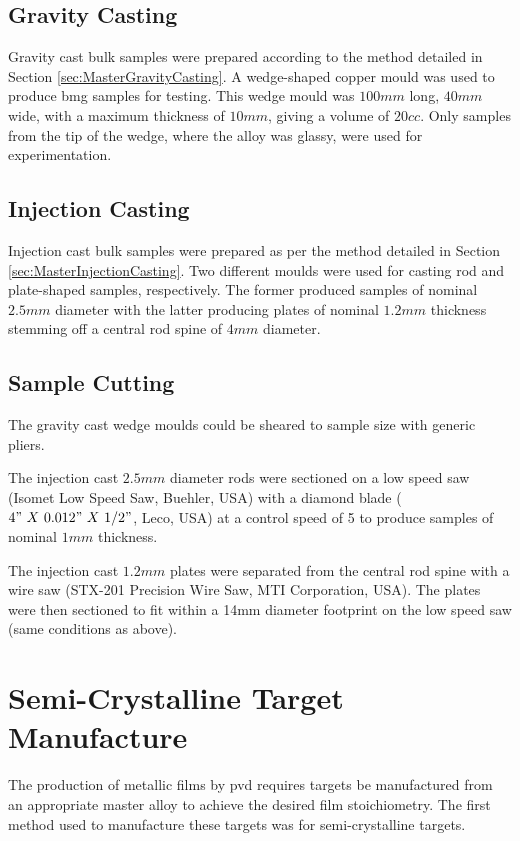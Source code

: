 \subsection{Gravity Casting}
Gravity cast bulk samples were prepared according to the method detailed in Section \ref{sec:MasterGravityCasting}. A wedge-shaped copper mould was used to produce \gls{bmg} samples for testing. This wedge mould was $100mm$ long, $40mm$ wide, with a maximum thickness of $10mm$, giving a volume of $20cc$. Only samples from the tip of the wedge, where the alloy was glassy, were used for experimentation. 

\subsection{Injection Casting}
Injection cast bulk samples were prepared as per the method detailed in Section \ref{sec:MasterInjectionCasting}. Two different moulds were used for casting rod and plate-shaped samples, respectively. The former produced samples of nominal $2.5 mm$ diameter with the latter producing plates of nominal $1.2 mm$ thickness stemming off a central rod spine of $4 mm$ diameter.  

\subsection{Sample Cutting}
The gravity cast wedge moulds could be sheared to sample size with generic pliers. 

The injection cast $2.5mm$ diameter rods were sectioned on a low speed saw (Isomet Low Speed Saw, Buehler, USA) with a diamond blade ($4"~ X~ 0.012"~ X~ 1/2"$, Leco, USA) at a control speed of 5 to produce samples of nominal $1mm$ thickness. 

The injection cast $1.2mm$ plates were separated from the central rod spine with a wire saw (STX-201 Precision Wire Saw, MTI Corporation, USA). The plates were then sectioned to fit within a 14mm diameter footprint on the low speed saw (same conditions as above). 

\section{Semi-Crystalline Target Manufacture} 
The production of metallic films by \gls{pvd} requires targets be manufactured from an appropriate master alloy to achieve the desired film stoichiometry. The first method used to manufacture these targets was for semi-crystalline targets.

